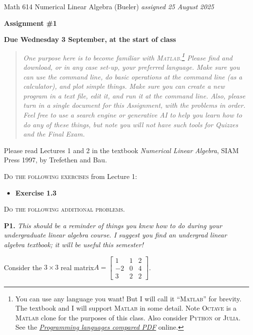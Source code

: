 \documentclass[12pt]{amsart}
\newcommand{\prob}[1]{\bigskip\noindent\textbf{#1.}\quad }
\newcommand{\Matlab}{\textsc{Matlab}\xspace}
\newcommand{\Octave}{\textsc{Octave}\xspace}
\newcommand{\Python}{\textsc{Python}\xspace}
\newcommand{\Julia}{\textsc{Julia}\xspace}
\begin{document}
\scriptsize \noindent Math 614 Numerical Linear Algebra (Bueler) \hfill \emph{assigned 25 August 2025}
\normalsize\medskip

\Large\centerline{\textbf{Assignment \#1}}
\large
\medskip

\centerline{\textbf{Due Wednesday 3 September, at the start of class}}
\medskip
\normalsize

\thispagestyle{empty}

\bigskip

\begin{quote}
{\small \emph{One purpose here is to become familiar with \Matlab.\footnote{You can use any language you want!  But I will call it ``\Matlab'' for brevity.  The textbook and I will support \Matlab in some detail.  Note \Octave is a \Matlab clone for the purposes of this class.  Also consider \Python or \Julia.  See the \href{https://bueler.github.io/compareMOP.pdf}{\emph{Programming languages compared PDF}} online.}  Please find and download, or in any case set-up, your preferred language.  Make sure you can use the command line, do basic operations at the command line (as a calculator), and plot simple things.  Make sure you can create a new program in a text file, edit it, and run it at the command line. Also, please turn in a single document for this Assignment, with the problems in order.  Feel free to use a search engine or generative AI to help you learn how to do any of these things, but note you will not have such tools for Quizzes and the Final Exam.}}
\end{quote}

\bigskip
\noindent Please read Lectures 1 and 2 in the textbook \emph{Numerical Linear Algebra}, SIAM Press 1997, by Trefethen and Bau.

\bigskip
\noindent \textsc{Do the following exercises} from Lecture 1:

\begin{itemize}
\item \textbf{Exercise 1.3}
\end{itemize}


\medskip
\noindent \textsc{Do the following additional problems.}

\prob{P1}  \emph{This should be a reminder of things you knew how to do during your undergraduate linear algebra course.  I suggest you find an undergrad linear algebra textbook; it will be useful this semester!}

\smallskip
Consider the $3\times 3$ real matrix\quad $A = \begin{bmatrix}   1     &     1    &     2 \\
                            -2    &     0    &     4 \\
                            3     &     2    &     2  \end{bmatrix}$.
\end{document}
